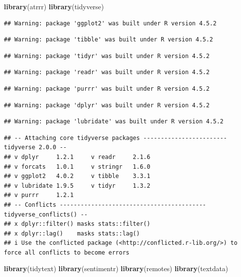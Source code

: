\documentclass[
]{article}
\newenvironment{Shaded}{\begin{snugshade}}{\end{snugshade}}
\newcommand{\FunctionTok}[1]{\textcolor[rgb]{0.13,0.29,0.53}{\textbf{#1}}}
\newcommand{\NormalTok}[1]{#1}
\begin{document}
\begin{Shaded}
\begin{Highlighting}[]
\FunctionTok{library}\NormalTok{(atrrr)}
\FunctionTok{library}\NormalTok{(tidyverse)}
\end{Highlighting}
\end{Shaded}

\begin{verbatim}
## Warning: package 'ggplot2' was built under R version 4.5.2
\end{verbatim}

\begin{verbatim}
## Warning: package 'tibble' was built under R version 4.5.2
\end{verbatim}

\begin{verbatim}
## Warning: package 'tidyr' was built under R version 4.5.2
\end{verbatim}

\begin{verbatim}
## Warning: package 'readr' was built under R version 4.5.2
\end{verbatim}

\begin{verbatim}
## Warning: package 'purrr' was built under R version 4.5.2
\end{verbatim}

\begin{verbatim}
## Warning: package 'dplyr' was built under R version 4.5.2
\end{verbatim}

\begin{verbatim}
## Warning: package 'lubridate' was built under R version 4.5.2
\end{verbatim}

\begin{verbatim}
## -- Attaching core tidyverse packages ------------------------ tidyverse 2.0.0 --
## v dplyr     1.2.1     v readr     2.1.6
## v forcats   1.0.1     v stringr   1.6.0
## v ggplot2   4.0.2     v tibble    3.3.1
## v lubridate 1.9.5     v tidyr     1.3.2
## v purrr     1.2.1     
## -- Conflicts ------------------------------------------ tidyverse_conflicts() --
## x dplyr::filter() masks stats::filter()
## x dplyr::lag()    masks stats::lag()
## i Use the conflicted package (<http://conflicted.r-lib.org/>) to force all conflicts to become errors
\end{verbatim}

\begin{Shaded}
\begin{Highlighting}[]
\FunctionTok{library}\NormalTok{(tidytext)}
\FunctionTok{library}\NormalTok{(sentimentr)}
\FunctionTok{library}\NormalTok{(remotes)}
\FunctionTok{library}\NormalTok{(textdata)}
\end{Highlighting}
\end{Shaded}
\end{document}
